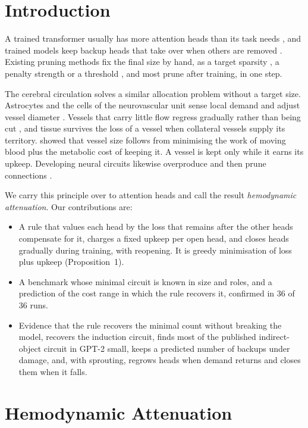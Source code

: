\documentclass[letterpaper]{article} %
\begin{document}
\section{Introduction}

A trained transformer usually has more attention heads than its task needs \citep{michel2019sixteen,voita2019analyzing}, and trained models keep backup heads that take over when others are removed \citep{wang2023interpretability,mcgrath2023hydra}. Existing pruning methods fix the final size by hand, as a target sparsity \citep{zhu2017prune}, a penalty strength \citep{voita2019analyzing} or a threshold \citep{conmy2023towards}, and most prune after training, in one step.

The cerebral circulation solves a similar allocation problem without a target size. Astrocytes and the cells of the neurovascular unit sense local demand and adjust vessel diameter \citep{iadecola2017nvu}. Vessels that carry little flow regress gradually rather than being cut \citep{korn2015pruning}, and tissue survives the loss of a vessel when collateral vessels supply its territory. \citet{murray1926} showed that vessel size follows from minimising the work of moving blood plus the metabolic cost of keeping it. A vessel is kept only while it earns its upkeep. Developing neural circuits likewise overproduce and then prune connections \citep{navlakha2015pruning}.

We carry this principle over to attention heads and call the result \emph{hemodynamic attenuation}. Our contributions are:
\begin{itemize}
\item A rule that values each head by the loss that remains after the other heads compensate for it, charges a fixed upkeep per open head, and closes heads gradually during training, with reopening. It is greedy minimisation of loss plus upkeep (Proposition~1).
\item A benchmark whose minimal circuit is known in size and roles, and a prediction of the cost range in which the rule recovers it, confirmed in 36 of 36 runs.
\item Evidence that the rule recovers the minimal count without breaking the model, recovers the induction circuit, finds most of the published indirect-object circuit in GPT-2 small, keeps a predicted number of backups under damage, and, with sprouting, regrows heads when demand returns and closes them when it falls.
\end{itemize}

\section{Hemodynamic Attenuation}
\end{document}
